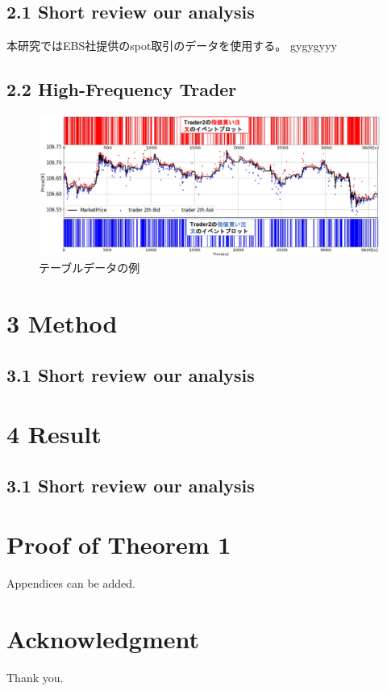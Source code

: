 \documentclass[a4paper,11pt,oneside,openany]{book}
\begin{document}
\section*{2.1 Short review our analysis}
本研究ではEBS社提供のspot取引のデータを使用する。
gygygyyy
\section*{2.2 High-Frequency Trader}
\begin{figure}[htb]
  \centering
  \includegraphics[scale=0.7]{./figures/order_sample.pdf}
  \caption{テーブルデータの例}\label{fig:hs}
\end{figure}



\chapter{3 Method}
\section*{3.1 Short review our analysis}


\chapter{4 Result}
\section*{3.1 Short review our analysis}


\appendix
\chapter{Proof of Theorem 1}
Appendices can be added.


\backmatter
\chapter{Acknowledgment}
Thank you.




\end{document}
